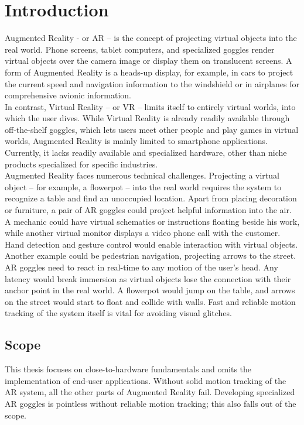 \chapter{Introduction}
\label{sec:Introduction}
Augmented Reality - or AR – is the concept of projecting virtual objects into the real world. Phone screens, tablet computers, and specialized goggles render virtual objects over the camera image or display them on translucent screens. A form of Augmented Reality is a heads-up display, for example, in cars to project the current speed and navigation information to the windshield or in airplanes for comprehensive avionic information.\\
In contrast, Virtual Reality – or VR – limits itself to entirely virtual worlds, into which the user dives. While Virtual Reality is already readily available through off-the-shelf goggles, which lets users meet other people and play games in virtual worlds, Augmented Reality is mainly limited to smartphone applications. Currently, it lacks readily available and specialized hardware, other than niche products specialized for specific industries.\\
Augmented Reality faces numerous technical challenges. Projecting a virtual object – for example, a flowerpot – into the real world requires the system to recognize a table and find an unoccupied location. Apart from placing decoration or furniture, a pair of AR goggles could project helpful information into the air. A mechanic could have virtual schematics or instructions floating beside his work, while another virtual monitor displays a video phone call with the customer. Hand detection and gesture control would enable interaction with virtual objects. Another example could be pedestrian navigation, projecting arrows to the street. \\
AR goggles need to react in real-time to any motion of the user’s head. Any latency would break immersion as virtual objects lose the connection with their anchor point in the real world. A flowerpot would jump on the table, and arrows on the street would start to float and collide with walls. Fast and reliable motion tracking of the system itself is vital for avoiding visual glitches.
\section{Scope}
\label{sec:Scope}
This thesis focuses on close-to-hardware fundamentals and omits the implementation of end-user applications. Without solid motion tracking of the AR system, all the other parts of Augmented Reality fail. Developing specialized AR goggles is pointless without reliable motion tracking; this also falls out of the scope.
